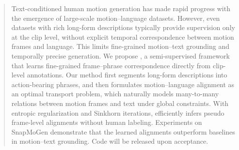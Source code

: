 \begin{abstract}
Text-conditioned human motion generation has made rapid progress with the emergence of large-scale motion--language datasets. However, even datasets with rich long-form descriptions typically provide supervision only at the clip level, without explicit temporal correspondence between motion frames and language. This limits fine-grained motion--text grounding and temporally precise generation. We propose \ours, a semi-supervised framework that learns fine-grained frame--phrase correspondence directly from clip-level annotations. Our method first segments long-form descriptions into action-bearing phrases, and then formulates motion--language alignment as an optimal transport problem, which naturally models many-to-many relations between motion frames and text under global constraints. With entropic regularization and Sinkhorn iterations, \ours efficiently infers pseudo frame-level alignments without human labeling. Experiments on SnapMoGen demonstrate that the learned alignments outperform baselines in motion--text grounding. Code will be released upon acceptance.

\end{abstract}